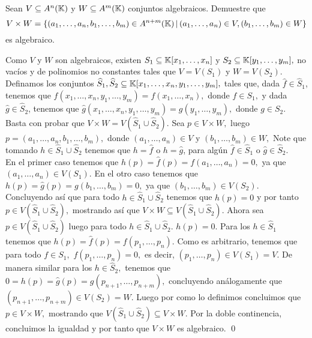 \begin{homeworkProblem}
    Sean $V\subseteq A^n(\mathbb{K})$ y $W\subseteq A^m(\mathbb{K})$ conjuntos algebraicos. Demuestre que
    $$V\times W=\{(a_1,\ldots,a_n,b_1,\ldots,b_m)\in A^{n+m}(\mathbb{K})\,|\,(a_1,\ldots,a_n)\in V,(b_1,\ldots,b_m)\in W\}$$
    es algebraico.
    \begin{solucion}
        Como $V$ y $W$ son algebraicos, existen $S_1\subseteq \mathbb{K}[x_1,\ldots,x_n]$ y $S_2\subseteq \mathbb{K}[y_1,\ldots,y_m],$ no vacíos y de polinomios no constantes tales que $V=V(S_1)$ y $W=V(S_2).$ Definamos los conjuntos $\widehat{S}_1,\widehat{S}_2\subseteq \mathbb{K}[x_1,\ldots,x_n,y_1,\ldots,y_m],$ tales que, dada $\hat{f}\in \widehat{S}_1$, tenemos que $\hat{f}(x_1,\ldots,x_n,y_1,\ldots,y_m)=f(x_1,\ldots,x_n),$ donde $f\in S_1,$ y dada $\hat{g}\in\widehat{S}_2$, tenemos que $\hat{g}(x_1,\ldots,x_n,y_1,\ldots,y_m)=g(y_1,\ldots,y_m),$ donde $g\in S_2.$ Basta con probar que $V\times W=V(\widehat{S}_1\cup\widehat{S}_2).$ Sea $p\in V\times W,$ luego $p=(a_1,\ldots,a_n,b_1,\ldots,b_m),$ donde $(a_1,\ldots,a_n)\in V$ y $(b_1,\ldots,b_m)\in W,$ Note que tomando $h\in \widehat{S}_1\cup\widehat{S}_2 $ tenemos que $h=\hat{f}$ o $h=\hat{g}$, para algún $\hat{f}\in \widehat{S}_1$ o $\hat{g}\in\widehat{S}_2.$\\
        En el primer caso tenemos que $h(p)=\hat{f}(p)=f(a_1,\ldots,a_n)=0,$ ya que $(a_1,\ldots,a_n)\in V(S_1).$ En el otro caso tenemos que $h(p)=\hat{g}(p)=g(b_1,\ldots,b_m)=0,$ ya que $(b_1,\ldots,b_m)\in V(S_2).$ Concluyendo así que para todo $h\in \widehat{S}_1\cup\widehat{S}_2$ tenemos que $h(p)=0$ y por tanto $p\in V(\widehat{S}_1\cup\widehat{S}_2),$ mostrando así que $V\times W\subseteq V(\widehat{S}_1\cup\widehat{S}_2).$ Ahora sea $p\in V(\widehat{S}_1\cup\widehat{S}_2)$ luego para todo $h\in \widehat{S}_1\cup\widehat{S}_2 .$ $h(p)=0.$ Para los $h\in \widehat{S}_1 $ tenemos que $h(p)=\hat{f}(p)=f(p_1,\ldots,p_n).$ Como es arbitrario, tenemos que para todo $f\in S_1,$ $f(p_1,\ldots,p_n)=0,$ es decir, $(p_1,\ldots,p_n)\in V(S_1)=V.$ De manera similar para los $h\in \widehat{S}_2,$ tenemos que $0=h(p)=\hat{g}(p)=g(p_{n+1},\ldots,p_{n+m}),$ concluyendo análogamente que $(p_{n+1},\ldots,p_{n+m})\in V(S_2)=W.$ Luego por como lo definimos concluimos que $p\in V\times W,$ mostrando que $V(\widehat{S}_1\cup\widehat{S}_2) \subseteq V\times W.$ Por la doble continencia, concluimos la igualdad y por tanto que $V\times W$ es algebraico. \qed
    \end{solucion}
\end{homeworkProblem}

